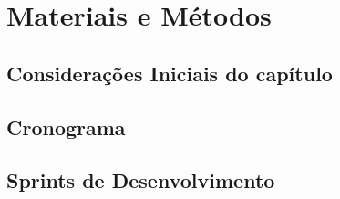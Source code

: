 \chapter{Materiais e Métodos}
\section{Considerações Iniciais do capítulo}
\section{Cronograma}
\section{Sprints de Desenvolvimento}